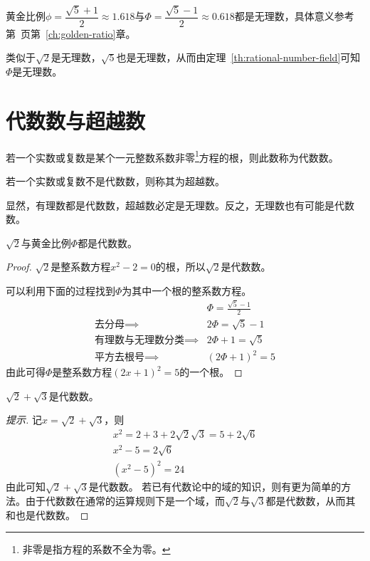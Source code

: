黄金比例$\phi=\dfrac{\sqrt5+1}2\approx1.618$与$\Phi=\dfrac{\sqrt5-1}2\approx0.618$都是无理数，具体意义参考第~\pageref{ch:golden-ratio}页第~\ref{ch:golden-ratio}章。

类似于$\sqrt2$是无理数，$\sqrt5$也是无理数，从而由定理~\ref{th:rational-number-field}可知$\Phi$是无理数。

\section{代数数与超越数}
\label{sec:algebraic-number-and-transcendental-number}

\begin{definition}
  若一个实数或复数是某个一元整数系数非零\footnote{非零是指方程的系数不全为零。}方程的根，则此数称为代数数。
\end{definition}

\begin{definition}
  若一个实数或复数不是代数数，则称其为超越数。
\end{definition}

显然，有理数都是代数数，超越数必定是无理数。反之，无理数也有可能是代数数。

\begin{example}
  $\sqrt2$与黄金比例$\Phi$都是代数数。
\end{example}
\begin{proof}
  $\sqrt2$是整系数方程$x^2-2=0$的根，所以$\sqrt2$是代数数。

  可以利用下面的过程找到$\Phi$为其中一个根的整系数方程。
  \begin{align*}
                         &\Phi=\frac{\sqrt5-1}{2}\\
    \text{去分母}\implies &2\Phi=\sqrt5-1\\
    \text{有理数与无理数分类}\implies &2\Phi+1=\sqrt5\\
    \text{平方去根号}\implies &\left(2\Phi+1\right)^2=5
  \end{align*}
  由此可得$\Phi$是整系数方程$\left(2x+1\right)^2=5$的一个根。
\end{proof}

\begin{example}
  $\sqrt2+\sqrt3$是代数数。
\end{example}
\begin{proof}[提示]
  记$x=\sqrt2+\sqrt3$，则
  \begin{equation*}
    \begin{gathered}
      x^2=2+3+2\sqrt2\sqrt3=5+2\sqrt6\\
      x^2-5=2\sqrt6\\
      \left(x^2-5\right)^2=24
    \end{gathered}
  \end{equation*}
  由此可知$\sqrt2+\sqrt3$是代数数。
  若已有代数论中的域的知识，则有更为简单的方法。由于代数数在通常的运算规则下是一个域，而$\sqrt2$与$\sqrt3$都是代数数，从而其和也是代数数。
\end{proof}

